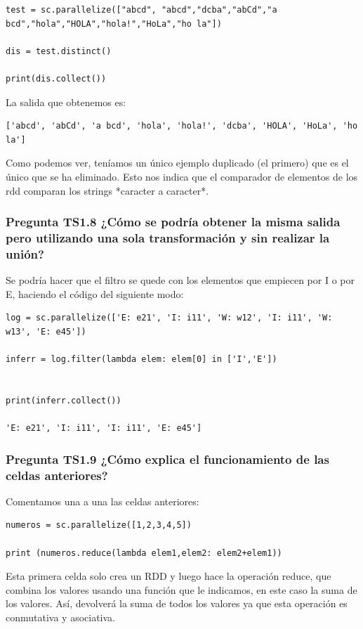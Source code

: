 \documentclass[11pt]{article}
\begin{document}
{{\begin{verbatim}
test = sc.parallelize(["abcd", "abcd","dcba","abCd","a bcd","hola","HOLA","hola!","HoLa","ho la"])

dis = test.distinct()

print(dis.collect())
\end{verbatim}
La salida que obtenemos es:

\begin{verbatim}
['abcd', 'abCd', 'a bcd', 'hola', 'hola!', 'dcba', 'HOLA', 'HoLa', 'ho la']
\end{verbatim}

Como podemos ver, teníamos un único ejemplo duplicado (el primero) que es el único que se ha eliminado. Esto nos indica que el comparador de elementos de los rdd comparan los strings *caracter a caracter*.

\subsubsection*{ Pregunta TS1.8 ¿Cómo se podría obtener la misma salida pero utilizando una sola transformación y sin realizar la unión?}


Se podría hacer que el filtro se quede con los elementos que empiecen por I o por E, haciendo el código del siguiente modo:

\begin{verbatim}
log = sc.parallelize(['E: e21', 'I: i11', 'W: w12', 'I: i11', 'W: w13', 'E: e45'])

inferr = log.filter(lambda elem: elem[0] in ['I','E'])


print(inferr.collect())

'E: e21', 'I: i11', 'I: i11', 'E: e45']

\end{verbatim}
\subsubsection*{ Pregunta TS1.9 ¿Cómo explica el funcionamiento de las celdas anteriores?}

Comentamos una a una las celdas anteriores:

\begin{verbatim}
numeros = sc.parallelize([1,2,3,4,5])

print (numeros.reduce(lambda elem1,elem2: elem2+elem1))
\end{verbatim}

Esta primera celda solo crea un RDD y luego hace la operación reduce, que combina los valores usando una función que le indicamos, en este caso la suma de los valores. Así, devolverá la suma de todos los valores ya que esta operación es conmutativa y asociativa.


}}
\end{document}

